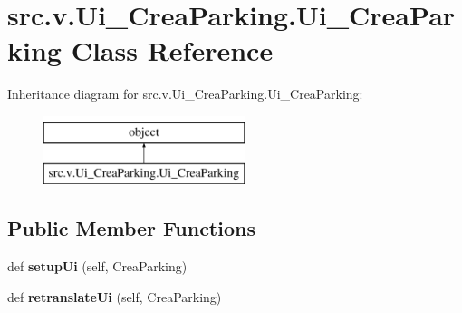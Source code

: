 \hypertarget{classsrc_1_1v_1_1_ui___crea_parking_1_1_ui___crea_parking}{}\section{src.\+v.\+Ui\+\_\+\+Crea\+Parking.\+Ui\+\_\+\+Crea\+Parking Class Reference}
\label{classsrc_1_1v_1_1_ui___crea_parking_1_1_ui___crea_parking}
Inheritance diagram for src.\+v.\+Ui\+\_\+\+Crea\+Parking.\+Ui\+\_\+\+Crea\+Parking\+:\begin{figure}[H]
\begin{center}
\leavevmode
\includegraphics[height=2.000000cm]{classsrc_1_1v_1_1_ui___crea_parking_1_1_ui___crea_parking}
\end{center}
\end{figure}
\subsection*{Public Member Functions}
\begin{DoxyCompactItemize}
\item 
\hypertarget{classsrc_1_1v_1_1_ui___crea_parking_1_1_ui___crea_parking_ae653f603a79e8b015cae17603534a690}{}def {\bfseries setup\+Ui} (self, Crea\+Parking)\label{classsrc_1_1v_1_1_ui___crea_parking_1_1_ui___crea_parking_ae653f603a79e8b015cae17603534a690}

\item 
\hypertarget{classsrc_1_1v_1_1_ui___crea_parking_1_1_ui___crea_parking_acf6d507258a63141d4688723b0c610cd}{}def {\bfseries retranslate\+Ui} (self, Crea\+Parking)\label{classsrc_1_1v_1_1_ui___crea_parking_1_1_ui___crea_parking_acf6d507258a63141d4688723b0c610cd}

\end{DoxyCompactItemize}
